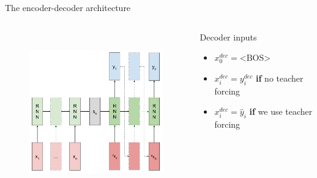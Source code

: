 \documentclass[12pt,aspectratio=169,handout]{beamer}
\begin{document}
\begin{frame}{The encoder-decoder architecture}
\vspace{-2em}
	\begin{columns}[T] %
		\begin{column}{.59\textwidth}
		
			\begin{figure}[h]
			\includegraphics[height=7cm]{img/sequence_to_sequence_anno.pdf}
		\end{figure}
		
		\end{column}
		\pause
		\begin{column}{.39\textwidth}
			\vspace{2cm}
			Decoder inputs
			\begin{itemize}
				\item $x_0^{dec} = \text{<BOS>}$
				\item $x_i^{dec} = y_{i}^{dec}$ \textbf{if} no teacher forcing
				\item $x_i^{dec} = \hat{y}_{i}$ \textbf{if} we use teacher forcing 
			\end{itemize}
		\end{column}
	\end{columns}

\end{frame}


\end{document}
